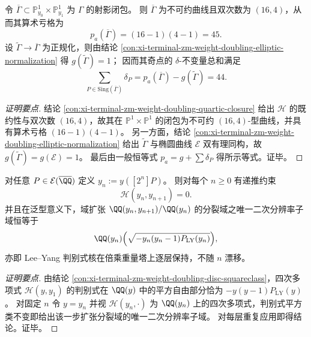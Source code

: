 \begin{conclusion}\label{con:xi-terminal-zm-weight-doubling-arithmetic-genus-delta-sum}
令 \(\overline{\Gamma}\subset\mathbb{P}^{1}_{y_0}\times\mathbb{P}^{1}_{y_1}\) 为 \(\Gamma\) 的射影闭包。
则 \(\overline{\Gamma}\) 为不可约曲线且双次数为 \((16,4)\)，从而其算术亏格为
\[
p_a(\overline{\Gamma})=(16-1)(4-1)=45.
\]
设 \(\widetilde{\Gamma}\to\overline{\Gamma}\) 为正规化，则由结论 \ref{con:xi-terminal-zm-weight-doubling-elliptic-normalization} 得 \(g(\widetilde{\Gamma})=1\)；
因而其奇点的 \(\delta\)-不变量总和满足
\[
\sum_{P\in \mathrm{Sing}(\overline{\Gamma})}\delta_P
=p_a(\overline{\Gamma})-g(\widetilde{\Gamma})
=44.
\]
\end{conclusion}
\begin{proof}[证明要点]
结论 \ref{con:xi-terminal-zm-weight-doubling-quartic-closure} 给出 \(\mathcal H\) 的既约性与双次数 \((16,4)\)，故其在 \(\mathbb{P}^{1}\times\mathbb{P}^{1}\) 的闭包为不可约 \((16,4)\)-型曲线，并具有算术亏格 \((16-1)(4-1)\)。
另一方面，结论 \ref{con:xi-terminal-zm-weight-doubling-elliptic-normalization} 给出 \(\widetilde{\Gamma}\) 与椭圆曲线 \(\mathcal{E}\) 双有理同构，故 \(g(\widetilde{\Gamma})=g(\mathcal{E})=1\)。
最后由一般恒等式 \(p_a=g+\sum \delta_P\) 得所示等式。证毕。
\end{proof}

\begin{conclusion}\label{con:xi-terminal-zm-weight-doubling-spine-invariance}
对任意 \(P\in\mathcal{E}(\overline{\QQ})\) 定义
\(
y_n:=y([2^{n}]P)
\)。
则对每个 \(n\ge 0\) 有递推约束
\[
\mathcal H(y_n,y_{n+1})=0.
\]
并且在泛型意义下，域扩张 \(\QQ(y_n,y_{n+1})/\QQ(y_n)\) 的分裂域之唯一二次分辨率子域恒等于
\[
\QQ(y_n)\Bigl(\sqrt{-y_n(y_n-1)P_{\mathrm{LY}}(y_n)}\Bigr),
\]
亦即 Lee--Yang 判别式核在倍乘重量塔上逐层保持，不随 \(n\) 漂移。
\end{conclusion}
\begin{proof}[证明要点]
由结论 \ref{con:xi-terminal-zm-weight-doubling-disc-squareclass}，四次多项式 \(\mathcal H(y,y_1)\) 的判别式在 \(\QQ(y)\) 中的平方自由部分恰为 \(-y(y-1)P_{\mathrm{LY}}(y)\)。
对固定 \(n\) 令 \(y=y_n\) 并视 \(\mathcal H(y_n,\cdot)\) 为 \(\QQ(y_n)\) 上的四次多项式，判别式平方类不变即给出该一步扩张分裂域的唯一二次分辨率子域。
对每层重复应用即得结论。证毕。
\end{proof}

